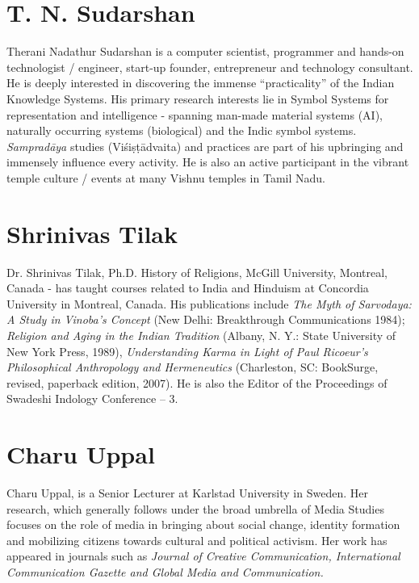 \vspace{-.3cm}

\section*{T. N. Sudarshan}

Therani Nadathur Sudarshan is a computer scientist, programmer and hands-on technologist / engineer, start-up founder, entrepreneur and technology consultant. He is deeply interested in discovering the immense “practicality” of the Indian Knowledge Systems. His primary research interests lie in Symbol Systems for representation and intelligence - spanning man-made material systems (AI), naturally occurring systems (biological) and the Indic symbol systems. \textit{Sampradāya} studies (Viśiṣṭādvaita) and practices are part of his upbringing and immensely influence every activity. He is also an active participant in the vibrant temple culture / events at many Vishnu temples in Tamil Nadu.

\vspace{-.3cm}

\section*{Shrinivas Tilak}

Dr. Shrinivas Tilak, Ph.D. History of Religions, McGill University, Montreal, Canada - has taught courses related to India and Hinduism at Concordia University in Montreal, Canada. His publications include \textit{The Myth of Sarvodaya: A Study in Vinoba's Concept} (New Delhi: Breakthrough Communications 1984); \textit{Religion and Aging in the Indian Tradition} (Albany, N. Y.: State University of New York Press, 1989), \textit{Understanding Karma in Light of Paul Ricoeur's Philosophical Anthropology and Hermeneutics} (Charleston, SC: BookSurge, revised, paperback edition, 2007). He is also the Editor of the Proceedings of Swadeshi Indology Conference – 3.

\vspace{-.3cm}

\section*{Charu Uppal}

Charu Uppal, is a Senior Lecturer at Karlstad University in Sweden. Her research, which generally follows under the broad umbrella of Media Studies focuses on the role of media in bringing about social change, identity formation and mobilizing citizens towards cultural and political activism. Her work has appeared in journals such as \textit{Journal of Creative Communication, International Communication Gazette and Global Media and Communication.}

